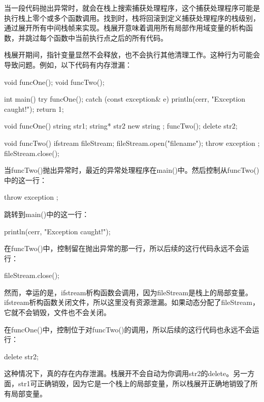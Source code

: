 
当一段代码抛出异常时，就会在栈上搜索捕获处理程序，这个捕获处理程序可能是执行栈上零个或多个函数调用。找到时，栈将回滚到定义捕获处理程序的栈级别，通过展开所有中间栈帧来实现。栈展开意味着调用所有局部作用域变量的析构函数，并跳过每个函数中当前执行点之后的所有代码。

栈展开期间，指针变量显然不会释放，也不会执行其他清理工作。这种行为可能会导致问题。例如，以下代码有内存泄漏：

\begin{cpp}
void funcOne();
void funcTwo();

int main()
{
    try {
        funcOne();
    } catch (const exception& e) {
        println(cerr, "Exception caught!");
        return 1;
    }
}

void funcOne()
{
    string str1;
    string* str2 { new string {} };
    funcTwo();
    delete str2;
}

void funcTwo()
{
    ifstream fileStream;
    fileStream.open("filename");
    throw exception {};
    fileStream.close();
}
\end{cpp}

当funcTwo()抛出异常时，最近的异常处理程序在main()中。然后控制从funcTwo()中的这一行：

\begin{cpp}
throw exception {};
\end{cpp}

跳转到main()中的这一行：

\begin{cpp}
println(cerr, "Exception caught!");
\end{cpp}

在funcTwo()中，控制留在抛出异常的那一行，所以后续的这行代码永远不会运行：

\begin{cpp}
fileStream.close();
\end{cpp}

然而，幸运的是，ifstream析构函数会调用，因为fileStream是栈上的局部变量。ifstream析构函数关闭文件，所以这里没有资源泄漏。如果动态分配了fileStream，它就不会销毁，文件也不会关闭。

在funcOne()中，控制位于对funcTwo()的调用，所以后续的这行代码也永远不会运行：

\begin{cpp}
delete str2;
\end{cpp}

这种情况下，真的存在内存泄漏。栈展开不会自动为你调用str2的delete。另一方面，str1可正确销毁，因为它是一个栈上的局部变量，所以栈展开正确地销毁了所有局部变量。

